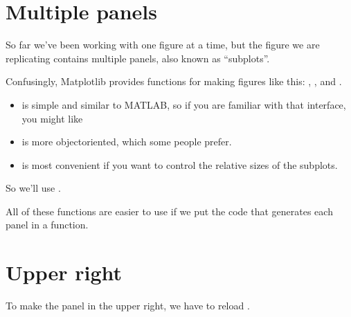 \documentclass[letterpaper,10pt,english]{sphinxmanual}
\begin{document}
\section{Multiple panels}
\label{\detokenize{07_plot:multiple-panels}}
So far we’ve been working with one figure at a time, but the figure we are replicating contains multiple panels, also known as “subplots”.

Confusingly, Matplotlib provides  functions for making figures like this: , , and .
\begin{itemize}
\item {} 
 is simple and similar to MATLAB, so if you are familiar with that interface, you might like 

\item {} 
 is more object\sphinxhyphen{}oriented, which some people prefer.

\item {} 
 is most convenient if you want to control the relative sizes of the subplots.

\end{itemize}

So we’ll use .

All of these functions are easier to use if we put the code that generates each panel in a function.


\section{Upper right}
\label{\detokenize{07_plot:upper-right}}
To make the panel in the upper right, we have to reload .

\begin{sphinxVerbatim}[commandchars=\\\{\}]
 

  
  

  
\end{sphinxVerbatim}
\end{document}
